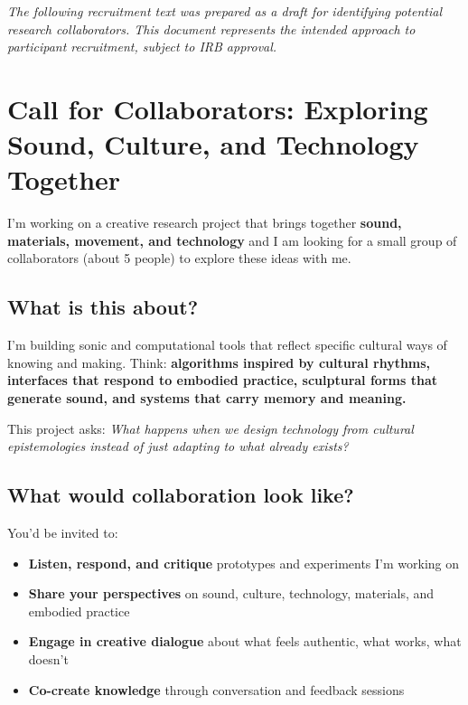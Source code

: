 \label{apdx:call-for-collaborators}

\begin{center}
	\textit{The following recruitment text was prepared as a draft for identifying potential research collaborators. This document represents the intended approach to participant recruitment, subject to IRB approval.}
\end{center}

\vspace{1em}

\section*{Call for Collaborators: Exploring Sound, Culture, and Technology Together}

I'm working on a creative research project that brings together \textbf{sound, materials, movement, and technology} and I am looking for a small group of collaborators (about 5 people) to explore these ideas with me.

\subsection*{What is this about?}

I'm building sonic and computational tools that reflect specific cultural ways of knowing and making. Think: \textbf{algorithms inspired by cultural rhythms, interfaces that respond to embodied practice, sculptural forms that generate sound, and systems that carry memory and meaning.}

This project asks: \textit{What happens when we design technology from cultural epistemologies instead of just adapting to what already exists?}

\subsection*{What would collaboration look like?}

You'd be invited to:

\begin{itemize}[noitemsep]
	\item \textbf{Listen, respond, and critique} prototypes and experiments I'm working on
	\item \textbf{Share your perspectives} on sound, culture, technology, materials, and embodied practice
	\item \textbf{Engage in creative dialogue} about what feels authentic, what works, what doesn't
	\item \textbf{Co-create knowledge} through conversation and feedback sessions
\end{itemize}

